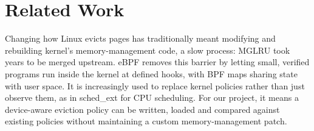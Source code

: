 \documentclass[11pt,sigconf,nonacm]{acmart}
\begin{document}







\section{Related Work}


Changing how Linux evicts pages has traditionally meant modifying and rebuilding kernel's memory-management code, a slow process: MGLRU took years to be merged upstream. eBPF removes this barrier by letting small, verified programs run inside the kernel at defined hooks, with BPF maps sharing state with user space. It is increasingly used to replace kernel policies rather than just observe them, as in sched\_ext for CPU scheduling. For our project, it means a device-aware eviction policy can be written, loaded and compared against existing policies without maintaining a custom memory-management patch.
\end{document}
